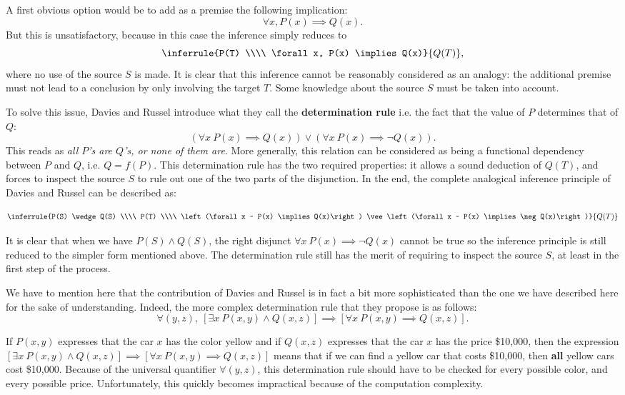 A first obvious option would be to add as a premise the following implication:
$$\forall x, P(x) \implies Q(x).$$
But this is unsatisfactory, because in this case the inference simply reduces
to
$$\inferrule{P(T) \\\\ \forall x, P(x) \implies Q(x)}{Q(T)},$$ where no use of the
source $S$ is made. It is clear that this inference cannot be reasonably
considered as an analogy: the additional premise must not lead to a conclusion
by only involving the target $T$. Some knowledge about the source $S$ must be
taken into account.

To solve this issue, Davies and Russel introduce what they call the
\textbf{determination rule} i.e. the fact that the value of $P$ determines that
of $Q$:
$$\left(\forall x ~ P(x) \implies Q(x)\right) \vee \left(\forall x ~ P(x) \implies
\neg Q(x)\right).$$
This reads as \textit{all $P$'s are $Q$'s, or none of them are}. More
generally, this relation can be considered as being a functional dependency
between $P$ and $Q$, i.e. $Q = f(P)$. This determination rule has the two
required properties: it allows a sound deduction of $Q(T)$, and forces to
inspect the source $S$ to rule out one of the two parts of the
disjunction. In the end, the complete analogical inference principle of Davies
and Russel can be described as:

$$\inferrule{P(S) \wedge Q(S) \\\\ P(T) \\\\  \left(\forall x ~ P(x) \implies
Q(x)\right) \vee \left(\forall x ~ P(x) \implies \neg Q(x)\right)}{Q(T)}$$

It is clear that when we have $P(S) \wedge Q(S)$, the right disjunct $\forall x
~ P(x) \implies \neg Q(x)$ cannot be true so the inference principle is still
reduced to the simpler form mentioned above. The determination rule still has
the merit of requiring to inspect the source $S$, at least in the first step
of the process.

We have to mention here that the contribution of Davies and Russel is in fact a
bit more sophisticated than the one we have described here for the sake of
understanding. Indeed, the more complex determination rule that they propose is
as follows:
$$\forall (y, z), ~ \left[\exists x~ P(x, y) \wedge Q(x, z)\right] \implies
\left[\forall x~ P(x, y) \implies Q(x, z)\right].
$$

If $P(x, y)$ expresses that the car $x$ has the color yellow and if $Q(x, z)$
expresses that the car $x$ has the price \$10,000, then the expression
$\left[\exists x~ P(x, y) \wedge Q(x, z)\right] \implies\left[\forall x~ P(x,
y) \implies Q(x, z)\right]$ means that if we can find a yellow car that costs
\$10,000, then \textbf{all} yellow cars cost \$10,000. Because of the
universal quantifier $\forall(y, z)$, this determination rule should have to be checked for
every possible color, and every possible price. Unfortunately, this quickly
becomes impractical because of the computation complexity.


